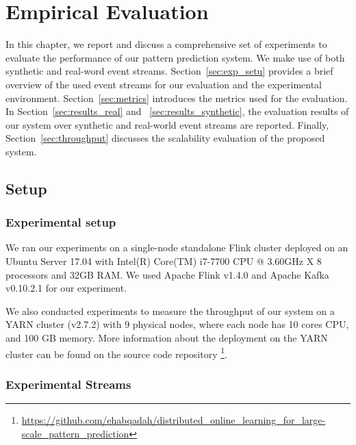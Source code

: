 \chapter{Empirical Evaluation}
\label{chapter:evaluation}

\par In this chapter, we report and discuss a comprehensive set of experiments to evaluate the performance of our pattern prediction system. We make use of both synthetic and real-word event streams. Section~\ref{sec:exp_setu} provides a brief overview of the used event streams for our evaluation and the experimental environment. Section~\ref{sec:metrics} introduces the metrics used for the evaluation. In Section~\ref{sec:results_real} and ~\ref{sec:results_synthetic}, the evaluation results of our system over synthetic and real-world event streams are reported. Finally, Section~\ref{sec:throughput} discusses the scalability evaluation of the proposed system.  

\section{Setup}
\label{sec:setup_data}

\subsection*{Experimental setup}
\label{sec:exp_setu}
\par We ran our experiments on a single-node standalone Flink cluster deployed on an Ubuntu Server 17.04 with Intel(R) Core(TM) i7-7700 CPU @ 3.60GHz X 8 processors and 32GB RAM. We used Apache Flink v1.4.0 and Apache Kafka v0.10.2.1 for our experiment.

\par We also conducted experiments to measure the throughput of our system on a YARN \cite{vavilapalli2013apache} cluster (v2.7.2) with 9 physical nodes, where each node has 10 cores CPU, and 100 GB memory. More information about the deployment on the YARN cluster can be found on the source code repository \footnote{ \url{https://github.com/ehabqadah/distributed_online_learning_for_large-scale_pattern_prediction}}.



\subsection*{Experimental Streams}

